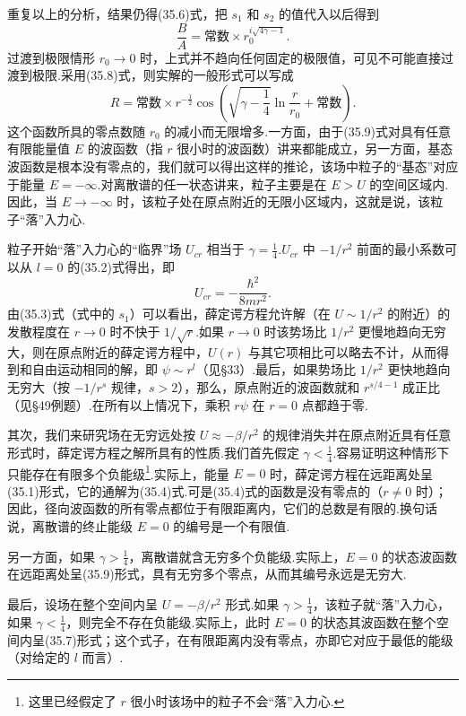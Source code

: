 重复以上的分析，结果仍得(35.6)式，把 $s_1$ 和 $s_2$ 的值代入以后得到
\begin{equation}
  \frac{B}{A}=\text{常数}\times r_0^{i\sqrt{4\gamma-1}}.
\end{equation}
过渡到极限情形 $r_0\to0$ 时，上式并不趋向任何固定的极限值，可见不可能直接过渡到极限.采用(35.8)式，则实解的一般形式可以写成
\begin{equation}
  R=\text{常数}\times r^{-\frac{1}{2}}
  \cos\left(\sqrt{\gamma-\frac{1}{4}}\ln\frac{r}{r_0}+\text{常数}\right).
\end{equation}
这个函数所具的零点数随 $r_0$ 的减小而无限增多.一方面，由于(35.9)式对具有任意有限能量值 $E$ 的波函数（指 $r$ 很小时的波函数）讲来都能成立，另一方面，基态波函数是根本没有零点的，我们就可以得出这样的推论，该场中粒子的“基态”对应于能量 $E=-\infty$.对离散谱的任一状态讲来，粒子主要是在 $E>U$ 的空间区域内.因此，当 $E\to-\infty$ 时，该粒子处在原点附近的无限小区域内，这就是说，该粒子“落”入力心.

粒子开始“落”入力心的“临界”场 $U_{cr}$ 相当于 $\gamma=\frac{1}{4}$.$U_{cr}$ 中 $-1/r^2$ 前面的最小系数可以从 $l=0$ 的(35.2)式得出，即
\begin{equation}
  U_{cr}=-\frac{\hbar^2}{8mr^2}.
\end{equation}
由(35.3)式（式中的 $s_1$）可以看出，薛定谔方程允许解（在 $U\sim1/r^2$ 的附近）的发散程度在 $r\to0$ 时不快于 $1/\sqrt{r}$.如果 $r\to0$ 时该势场比 $1/r^2$ 更慢地趋向无穷大，则在原点附近的薛定谔方程中，$U(r)$ 与其它项相比可以略去不计，从而得到和自由运动相同的解，即 $\psi\sim r^l$（见§33）.最后，如果势场比 $1/r^2$ 更快地趋向无穷大（按 $-1/r^s$ 规律，$s>2$），那么，原点附近的波函数就和 $r^{s/4-1}$ 成正比（见§49例题）.在所有以上情况下，乘积 $r\psi$ 在 $r=0$ 点都趋于零.

其次，我们来研究场在无穷远处按 $U\approx-\beta/r^2$ 的规律消失并在原点附近具有任意形式时，薛定谔方程之解所具有的性质.我们首先假定 $\gamma<\frac{1}{4}$.容易证明这种情形下只能存在有限多个负能级\footnote{这里已经假定了 $r$ 很小时该场中的粒子不会“落”入力心.}.实际上，能量 $E=0$ 时，薛定谔方程在远距离处呈(35.1)形式，它的通解为(35.4)式.可是(35.4)式的函数是没有零点的（$r\neq0$ 时）；因此，径向波函数的所有零点都位于有限距离内，它们的总数是有限的.换句话说，离散谱的终止能级 $E=0$ 的编号是一个有限值.

另一方面，如果 $\gamma>\frac{1}{4}$，离散谱就含无穷多个负能级.实际上，$E=0$ 的状态波函数在远距离处呈(35.9)形式，具有无穷多个零点，从而其编号永远是无穷大.

最后，设场在整个空间内呈 $U=-\beta/r^2$ 形式.如果 $\gamma>\frac{1}{4}$，该粒子就“落”入力心，如果 $\gamma<\frac{1}{4}$，则完全不存在负能级.实际上，此时 $E=0$ 的状态其波函数在整个空间内呈(35.7)形式；这个式子，在有限距离内没有零点，亦即它对应于最低的能级（对给定的 $l$ 而言）.


